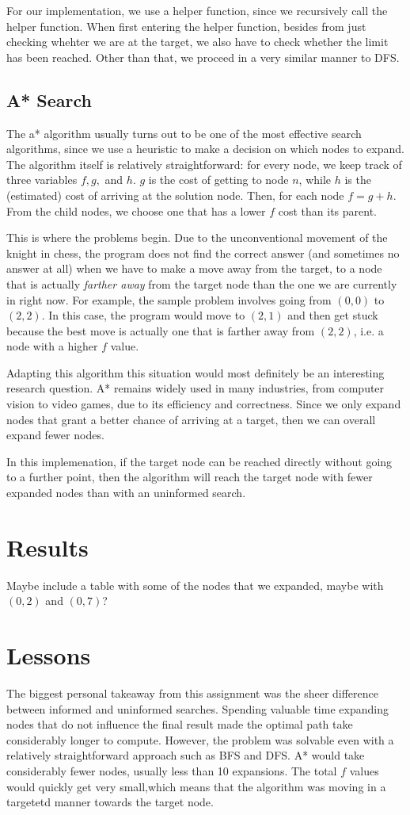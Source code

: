 \documentclass{article}
\begin{document}
	For our implementation, we use a helper function, since we recursively call the helper function. When first
	entering the helper function, besides from just checking whehter we are at the target, we also have to check
	whether the limit has been reached. Other than that, we proceed in a very similar manner to DFS.

\subsection{A* Search}
	The a* algorithm usually turns out to be one of the most effective search algorithms, since we 
	use a heuristic to make a decision on which nodes to expand. The algorithm itself is relatively 
	straightforward: for every node, we keep track of three variables $f, g,$ and $h$.  $g$ is the 
	cost of getting to node $n$, while $h$ is the (estimated) cost of arriving at the solution node. 
	Then, for each node $f = g + h$. From the child nodes, we choose one that has a lower $f$ cost than
	its parent. 

	This is where the problems begin. Due to the unconventional movement of the knight in chess, 
	the program does not find the correct answer (and sometimes no answer at all) when we have to make
	a move away from the target, to a node that is actually \textit{farther away} from the target node
	than the one we are currently in right now. For example, the sample problem involves going from 
	$(0, 0)$ to $(2, 2)$. In this case, the program would move to $(2, 1)$ and then get stuck because
	the best move is actually one that is farther away from $(2, 2)$, i.e. a node with a higher $f$ value.

	Adapting this algorithm this situation would most definitely be an interesting research question. 
	A* remains widely used in many industries, from computer vision to video games, due to its efficiency
	and correctness. Since we only expand nodes that grant a better chance of arriving at a target, then
	we can overall expand fewer nodes.

	In this implemenation, if the target node can be reached directly without going to a further point, 
	then the algorithm will reach the target node with fewer expanded nodes than with an uninformed 
	search. 
\section{Results}
Maybe include a table with some of the nodes that we expanded, maybe with $(0, 2)$ and $(0, 7)$?
\section{Lessons}
	The biggest personal takeaway from this assignment was the sheer difference between informed and 
	uninformed searches. Spending valuable time expanding nodes that do not influence the final 
	result made the optimal path take considerably longer to compute. However, the problem was 
	solvable even with a relatively straightforward approach such as BFS and DFS. A* would take 
	considerably fewer nodes, usually less than 10 expansions. The total $f$ values would quickly 
	get very small,which means that the algorithm was moving in a targetetd manner towards the
	target node.
\end{document}
